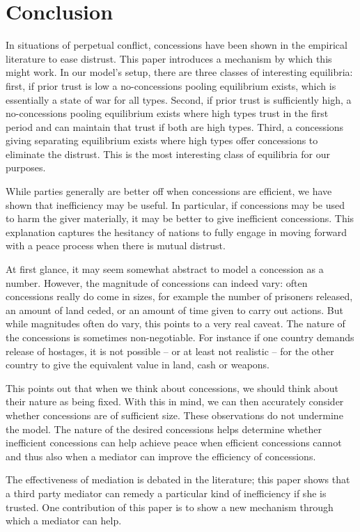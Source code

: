 \documentclass[12pt, letterpaper]{article}
\begin{document}
\section{Conclusion}
In situations of perpetual conflict, concessions have been shown in the empirical literature to ease distrust. This paper introduces a mechanism by which this might work. In our model's setup, there are three classes of interesting equilibria: first, if prior trust is low a no-concessions pooling equilibrium exists, which is essentially a state of war for all types. Second, if prior trust is sufficiently high, a no-concessions pooling equilibrium exists where high types trust in the first period and can maintain that trust if both are high types. Third, a concessions giving separating equilibrium exists where high types offer concessions to eliminate the distrust. This is the most interesting class of equilibria for our purposes.

While parties generally are better off when concessions are efficient, we have shown that inefficiency may be useful. In particular, if concessions may be used to harm the giver materially, it may be better to give inefficient concessions. This explanation captures the hesitancy of nations to fully engage in moving forward with a peace process when there is mutual distrust. 

At first glance, it may seem somewhat abstract to model a concession as a number. However, the magnitude of concessions can indeed vary: often concessions really do come in sizes, for example the number of prisoners released, an amount of land ceded, or an amount of time given to carry out actions. But while magnitudes often do vary, this points to a very real caveat. The nature of the concessions is sometimes non-negotiable. For instance if one country demands release of hostages, it is not possible -- or at least not realistic -- for the other country to give the equivalent value in land, cash or weapons.

This points out that when we think about concessions, we should think about their nature as being fixed. With this in mind, we can then accurately consider whether concessions are of sufficient size. These observations do not undermine the model. The nature of the desired concessions helps determine whether inefficient concessions can help achieve peace when efficient concessions cannot and thus also when a mediator can improve the efficiency of concessions.

The effectiveness of mediation is debated in the literature; this paper shows that a third party mediator can remedy a particular kind of inefficiency if she is trusted. One contribution of this paper is to show a new mechanism through which a mediator can help.
\end{document}
